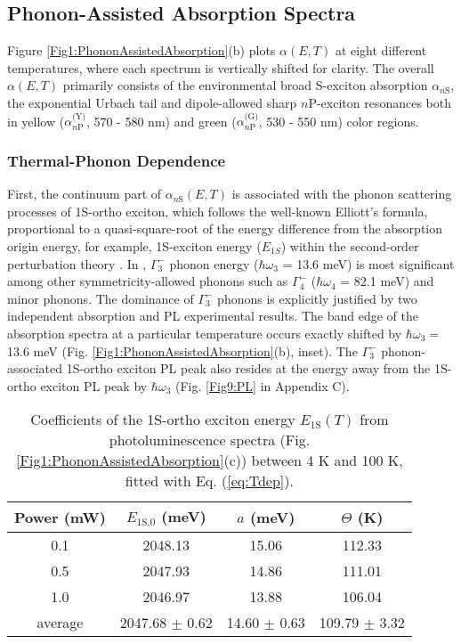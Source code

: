 \documentclass[aps,reprint,amsmath,amssymb,prb]{revtex4-1}
\begin{document}
\subsection{Phonon-Assisted Absorption Spectra}

Figure \ref{Fig1:PhononAssistedAbsorption}(b) plots $\alpha (E, T) $ at eight different temperatures, where each spectrum is vertically shifted for clarity. The overall $\alpha (E, T) $ primarily consists of the environmental broad S-exciton absorption  $\alpha_{n\text{S}}$, the exponential Urbach tail and dipole-allowed sharp $n$P-exciton resonances both in yellow ($\alpha_{n\text{P}}^{\text{(Y)}}$, 570 - 580 nm) and green  ($\alpha_{n\text{P}}^{\text{(G)}}$, 530 - 550 nm) color regions.

\subsubsection{Thermal-Phonon Dependence}

First, the continuum part of $\alpha_{n\text{S}} (E, T)$ is associated with the phonon scattering processes of 1S-ortho exciton, %
which follows the well-known Elliott's formula, proportional to a quasi-square-root of the energy difference from the absorption origin energy, for example, 1S-exciton energy ($E_{1S}$) within the second-order perturbation theory \cite{Elliott1957}. 
In , ${\Gamma}_3^{-}$ phonon energy ($\hbar\omega_3$ = 13.6 meV) is most significant among other symmetricity-allowed phonons such as ${\Gamma}_4^{-}$ ($\hbar \omega_4$ = 82.1 meV) and minor phonons. The dominance of ${\Gamma}_3^{-}$ phonons is explicitly justified by two independent absorption and PL experimental results. The band edge of the absorption spectra at a particular temperature occurs exactly shifted by $\hbar\omega_3 =$ 13.6 meV (Fig. \ref{Fig1:PhononAssistedAbsorption}(b), inset). The ${\Gamma}_3^{-}$ phonon-associated 1S-ortho exciton PL peak also resides at the energy away from the 1S-ortho exciton PL peak by $\hbar\omega_3$ (Fig. \ref{Fig9:PL} in Appendix C).

\begin{table}
 \caption{Coefficients of the 1S-ortho exciton energy $E_{\text{1S}} (T)$ from photoluminescence spectra (Fig.\ref{Fig1:PhononAssistedAbsorption}(c)) between 4 K and 100 K, fitted with Eq. (\ref{eq:Tdep}).}
    \label{tab1:E1SCotFitRes}
    \begin{ruledtabular}
    \begin{tabular}{cccc} 
    Power (mW) & $E_{\text{1S,0}}$ (meV) & $a$ (meV) & $\Theta$ (K) \\  
 \hline 
        0.1 & 2048.13  & 15.06 & 112.33 \\ 
        0.5 & 2047.93  & 14.86 & 111.01\\ 
        1.0 & 2046.97  & 13.88 & 106.04 \\ 
        \hline
        average & 2047.68 $\pm$ 0.62 & 14.60 $\pm$ 0.63 & 109.79 $\pm$ 3.32 \\ 
   \end{tabular}
   \end{ruledtabular}
\end{table}
\end{document}
